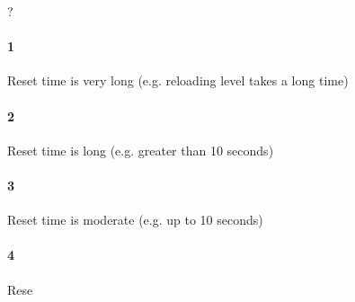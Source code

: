?\paragraph{1}Reset time is very long (e.g. reloading level takes a long time)\paragraph{2}Reset time is long (e.g. greater than 10 seconds)\paragraph{3}Reset time is moderate (e.g. up to 10 seconds)\paragraph{4}Rese